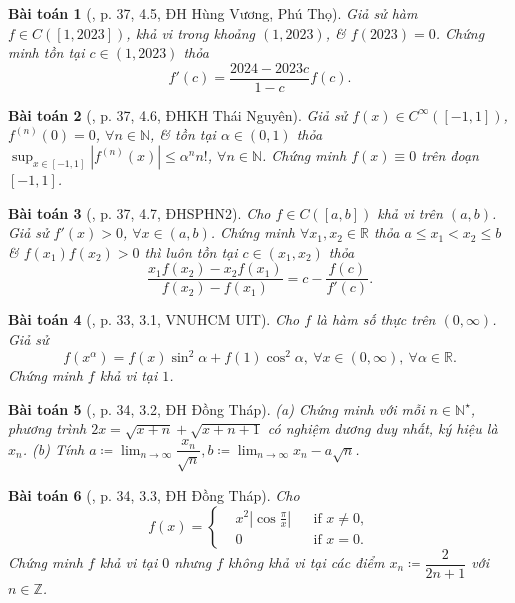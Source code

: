 \documentclass[oneside]{book}
\newtheorem{baitoan}{Bài toán}
\begin{document}
\begin{baitoan}[\cite{VMS_VMC2023}, p. 37, 4.5, ĐH Hùng Vương, Phú Thọ]
	Giả sử hàm $f\in C([1,2023])$, khả vi trong khoảng $(1,2023)$, \& $f(2023) = 0$. Chứng minh tồn tại $c\in(1,2023)$ thỏa
	\begin{equation*}
		f'(c) = \frac{2024 - 2023c}{1 - c}f(c).
	\end{equation*}
\end{baitoan}

\begin{baitoan}[\cite{VMS_VMC2023}, p. 37, 4.6, ĐHKH Thái Nguyên]
	Giả sử $f(x)\in C^\infty([-1,1])$, $f^{(n)}(0) = 0$, $\forall n\in\mathbb{N}$, \& tồn tại $\alpha\in(0,1)$ thỏa $\sup_{x\in[-1,1]} |f^{(n)}(x)|\le\alpha^nn!$, $\forall n\in\mathbb{N}$. Chứng minh $f(x)\equiv0$ trên đoạn $[-1,1]$.
\end{baitoan}

\begin{baitoan}[\cite{VMS_VMC2023}, p. 37, 4.7, ĐHSPHN2]
	Cho $f\in C([a,b])$ khả vi trên $(a,b)$. Giả sử $f'(x) > 0$, $\forall x\in(a,b)$. Chứng minh $\forall x_1,x_2\in\mathbb{R}$ thỏa $a\le x_1 < x_2\le b$ \& $f(x_1)f(x_2) > 0$ thì luôn tồn tại $c\in(x_1,x_2)$ thỏa
	\begin{equation*}
		\frac{x_1f(x_2) - x_2f(x_1)}{f(x_2) - f(x_1)} = c - \frac{f(c)}{f'(c)}.
	\end{equation*}
\end{baitoan}

\begin{baitoan}[\cite{VMS_VMC2024}, p. 33, 3.1, VNUHCM UIT]
	Cho $f$ là hàm số thực trên $(0,\infty)$. Giả sử
	\begin{equation*}
		f(x^\alpha) = f(x)\sin^2\alpha + f(1)\cos^2\alpha,\ \forall x\in(0,\infty),\ \forall\alpha\in\mathbb{R}.
	\end{equation*}
	Chứng minh $f$ khả vi tại $1$.
\end{baitoan}

\begin{baitoan}[\cite{VMS_VMC2024}, p. 34, 3.2, ĐH Đồng Tháp]
	(a) Chứng minh với mỗi $n\in\mathbb{N}^\star$, phương trình $2x = \sqrt{x + n} + \sqrt{x + n + 1}$ có nghiệm dương duy nhất, ký hiệu là $x_n$. (b) Tính $a\coloneqq\lim_{n\to\infty} \dfrac{x_n}{\sqrt{n}},b\coloneqq \lim_{n\to\infty} x_n - a\sqrt{n}$.
\end{baitoan}

\begin{baitoan}[\cite{VMS_VMC2024}, p. 34, 3.3, ĐH Đồng Tháp]
	Cho
	\begin{equation*}
		f(x) = \left\{\begin{split}
			&x^2\left|\cos\frac{\pi}{x}\right|&&\mbox{if } x\ne0,\\
			&0&&\mbox{if } x = 0.
		\end{split}\right.
	\end{equation*}
	Chứng minh $f$ khả vi tại $0$ nhưng $f$ không khả vi tại các điểm $x_n\coloneqq\dfrac{2}{2n + 1}$ với $n\in\mathbb{Z}$.
\end{baitoan}
\end{document}
